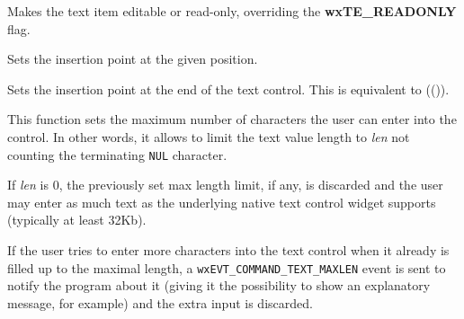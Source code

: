 


\label{wxtextctrlseteditable}


Makes the text item editable or read-only, overriding the {\bf wxTE\_READONLY} flag.






\label{wxtextctrlsetinsertionpoint}


Sets the insertion point at the given position.




\label{wxtextctrlsetinsertionpointend}


Sets the insertion point at the end of the text control. This is equivalent
to (()).


\label{wxtextctrlsetmaxlength}


This function sets the maximum number of characters the user can enter into the
control. In other words, it allows to limit the text value length to {\it len}
not counting the terminating {\tt NUL} character.

If {\it len} is $0$, the previously set max length limit, if any, is discarded
and the user may enter as much text as the underlying native text control
widget supports (typically at least 32Kb).

If the user tries to enter more characters into the text control when it
already is filled up to the maximal length, a
{\tt wxEVT\_COMMAND\_TEXT\_MAXLEN} event is sent to notify the program about it
(giving it the possibility to show an explanatory message, for example) and the
extra input is discarded.

